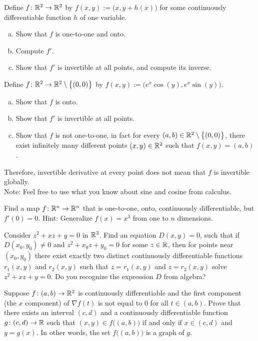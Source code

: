 \begin{exercise}
Define $f \colon {\mathbb{R}}^2 \to {\mathbb{R}}^2$ by $f(x,y) :=
\bigl(x,y+h(x)\bigr)$ for some continuously differentiable function $h$ of one
variable.
\begin{enumerate}[a)]
\item
Show that $f$ is one-to-one and onto.
\item
Compute $f'$.
\item
Show that $f'$ is invertible at all points, and compute
its inverse.
\end{enumerate}
\end{exercise}

\begin{exercise}
Define $f \colon {\mathbb{R}}^2 \to {\mathbb{R}}^2 \setminus \bigl\{ (0,0) \bigr\}$ by $f(x,y) :=
\bigl(e^x\cos(y),e^x\sin(y)\bigr)$.
\begin{enumerate}[a)]
\item
Show that $f$ is onto.
\item
Show that $f'$ is invertible at all points.
\item
Show that $f$ is not one-to-one, in fact for every $(a,b) \in {\mathbb{R}}^2
\setminus \bigl\{ (0,0) \bigr\}$,
there exist infinitely many different points $(x,y) \in {\mathbb{R}}^2$ such that 
$f(x,y) = (a,b)$.
\end{enumerate}
Therefore, invertible derivative at every point does not mean that
$f$ is invertible globally.\\
Note: Feel free to use what you know about sine and cosine from calculus.
\end{exercise}

\begin{exercise}
Find a map $f \colon {\mathbb{R}}^n \to {\mathbb{R}}^n$ that is one-to-one, onto,
continuously differentiable, but $f'(0) = 0$.  Hint: Generalize $f(x) = x^3$ from one
to $n$ dimensions.
\end{exercise}

\begin{exercise}
Consider $z^2 + xz + y =0$ in ${\mathbb{R}}^3$.  Find an equation $D(x,y)=0$, such that
if $D(x_0,y_0) \not= 0$ and $z^2+x_0z+y_0 = 0$ for some $z \in {\mathbb{R}}$,
then for points near $(x_0,y_0)$ there exist
exactly two distinct continuously differentiable functions $r_1(x,y)$
and $r_2(x,y)$ such that $z=r_1(x,y)$ and $z=r_2(x,y)$ solve
$z^2 + xz + y =0$.  Do you recognize the expression $D$ from algebra?
\end{exercise}


\begin{exercise}
Suppose $f \colon (a,b) \to {\mathbb{R}}^2$ is continuously differentiable and
the first component (the $x$ component) of $\nabla f(t)$ is not equal to 0
for all $t \in (a,b)$.
Prove that there exists an interval $(c,d)$ and
a continuously differentiable function $g \colon (c,d) \to {\mathbb{R}}$
such that 
$(x,y) \in f\bigl((a,b)\bigr)$ if and only if $x \in (c,d)$ and $y=g(x)$.
In other words, the set
$f\bigl((a,b)\bigr)$ is a graph of $g$.
\end{exercise}

